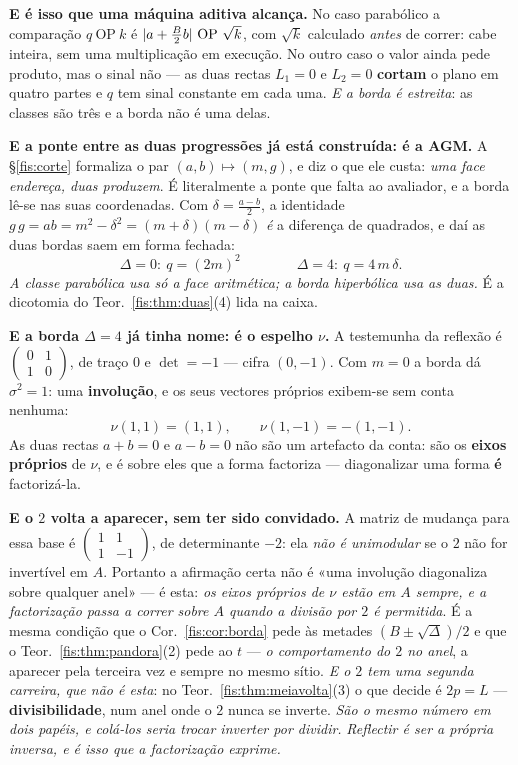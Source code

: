 \documentclass[livro.tex]{subfiles}
\begin{document}
\medskip\noindent\textbf{E é isso que uma máquina aditiva alcança.} No caso
parabólico a comparação $q\ \mathrm{OP}\ k$ é
$\abs{a+\tfrac{B}{2}b}\ \mathrm{OP}\ \sqrt{k}$, com $\sqrt{k}$ calculado
\emph{antes} de correr: cabe inteira, sem uma multiplicação em execução. No outro
caso o valor ainda pede produto, mas o sinal não --- as duas rectas $L_1=0$ e
$L_2=0$ \textbf{cortam} o plano em quatro partes e $q$ tem sinal constante em cada
uma. \emph{E a borda é estreita}: as classes são três e a borda não é uma delas.

\medskip\noindent\textbf{E a ponte entre as duas progressões já está construída:
é a AGM.} A §\ref{fis:corte} formaliza o par $(a,b)\mapsto(m,g)$, e diz o que ele
custa: \emph{uma face endereça, duas produzem}. É literalmente a ponte que falta
ao avaliador, e a borda lê-se nas suas coordenadas. Com $\delta=\tfrac{a-b}{2}$, a
identidade $g\,g=ab=m^{2}-\delta^{2}=(m+\delta)(m-\delta)$ \emph{é} a diferença de quadrados, e daí as duas bordas saem em forma fechada:
\[
\Delta=0:\ q=(2m)^{2}
\qquad\qquad
\Delta=4:\ q=4\,m\,\delta .
\]
\emph{A classe parabólica usa só a face aritmética; a borda hiperbólica usa as
duas.} É a dicotomia do Teor.~\ref{fis:thm:duas}(4) lida na caixa.

\medskip\noindent\textbf{E a borda $\Delta=4$ já tinha nome: é o espelho $\nu$.} A
testemunha da reflexão é
$\left(\begin{smallmatrix}0&1\\1&0\end{smallmatrix}\right)$, de traço $0$ e
$\det=-1$ --- cifra $(0,-1)$. Com $m=0$ a borda dá $\sigma^{2}=1$: uma
\textbf{involução}, e os seus vectores próprios exibem-se sem conta nenhuma:
\[
\nu(1,1)=(1,1),\qquad \nu(1,-1)=-(1,-1) .
\]
As duas rectas $a+b=0$ e $a-b=0$ não são um artefacto da conta: são os
\textbf{eixos próprios} de $\nu$, e é sobre eles que a forma factoriza ---
diagonalizar uma forma \textbf{é} factorizá-la.

\medskip\noindent\textbf{E o $2$ volta a aparecer, sem ter sido convidado.} A
matriz de mudança para essa base é
$\left(\begin{smallmatrix}1&1\\1&-1\end{smallmatrix}\right)$, de determinante
$-2$: ela \emph{não é unimodular} se o $2$ não for invertível em $A$. Portanto a
afirmação certa não é «uma involução diagonaliza sobre qualquer anel» --- é esta:
\emph{os eixos próprios de $\nu$ estão em $A$ sempre, e a factorização passa a
correr sobre $A$ quando a divisão por $2$ é permitida}. É a mesma condição que o
Cor.~\ref{fis:cor:borda} pede às metades $(B\pm\sqrt\Delta)/2$ e que o
Teor.~\ref{fis:thm:pandora}(2) pede ao $t$ --- \emph{o comportamento do $2$ no
anel}, a aparecer pela terceira vez e sempre no mesmo sítio. \emph{E o $2$ tem
uma segunda carreira, que não é esta}: no Teor.~\ref{fis:thm:meiavolta}(3) o que
decide é $2p=L$ --- \textbf{divisibilidade}, num anel onde o $2$ nunca se
inverte. \emph{São o mesmo número em dois papéis, e colá-los seria trocar
inverter por dividir.}
\emph{Reflectir é ser a própria inversa, e é isso que a factorização exprime.}
\end{document}
